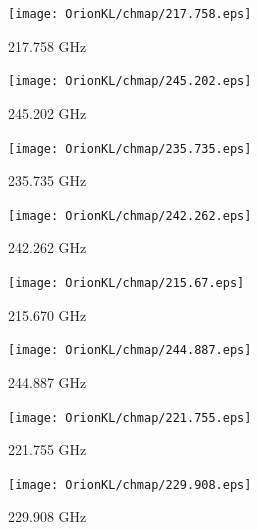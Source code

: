 \begin{figure}[htbp]
  \centering
  \texttt{[image: OrionKL/chmap/217.758.eps]}
  \caption{217.758 GHz}
  \label{ch_0}
\end{figure}

\begin{figure}[htbp]
  \centering
  \texttt{[image: OrionKL/chmap/245.202.eps]}
  \caption{245.202 GHz}
  \label{ch_1}
\end{figure}

\begin{figure}[htbp]
  \centering
  \texttt{[image: OrionKL/chmap/235.735.eps]}
  \caption{235.735 GHz}
  \label{ch_2}
\end{figure}

\begin{figure}[htbp]
  \centering
  \texttt{[image: OrionKL/chmap/242.262.eps]}
  \caption{242.262 GHz}
  \label{ch_3}
\end{figure}

\begin{figure}[htbp]
  \centering
  \texttt{[image: OrionKL/chmap/215.67.eps]}
  \caption{215.670 GHz}
  \label{ch_4}
\end{figure}

\begin{figure}[htbp]
  \centering
  \texttt{[image: OrionKL/chmap/244.887.eps]}
  \caption{244.887 GHz}
  \label{ch_5}
\end{figure}

\begin{figure}[htbp]
  \centering
  \texttt{[image: OrionKL/chmap/221.755.eps]}
  \caption{221.755 GHz}
  \label{ch_6}
\end{figure}

\begin{figure}[htbp]
  \centering
  \texttt{[image: OrionKL/chmap/229.908.eps]}
  \caption{229.908 GHz}
  \label{ch_7}
\end{figure}

